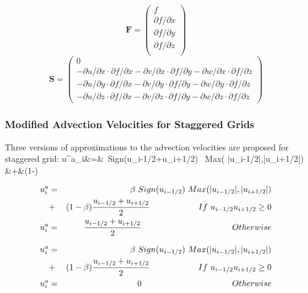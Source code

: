\begin{equation}
\textbf{F}=
\begin{pmatrix}
f \\ \partial f/\partial x \\ \partial f/\partial y \\ \partial f/\partial z \\
\end{pmatrix}
\end{equation}
\begin{equation}
\textbf{S}=
\begin{pmatrix}
0
\\ -\partial u /\partial x \cdot \partial f/\partial x-\partial v /\partial x \cdot \partial f/\partial
y-\partial w /\partial x \cdot \partial f/\partial z
\\ -\partial u /\partial y \cdot \partial f/\partial x-\partial v /\partial y \cdot \partial f/\partial
y-\partial w /\partial y \cdot \partial f/\partial z
\\ -\partial u /\partial z \cdot \partial f/\partial x-\partial v /\partial z \cdot \partial f/\partial
y-\partial w /\partial z \cdot \partial f/\partial z
\end{pmatrix}
\end{equation}

\subsubsection*{Modified Advection Velocities for Staggered Grids}

Three versions of approximations to the advection velocities are proposed for staggered grid:
\ba
u^a_{i}&=&\beta \ Sign(u_{i-1/2}+u_{i+1/2}) \ Max( |u_{i-1/2}|,|u_{i+1/2}|)\nn \\
&+&(1-\beta) 
\ea

\begin{eqnarray}
u^a_{i}&=&
\beta \ Sign(u_{i-1/2})\ Max( |u_{i-1/2}|,|u_{i+1/2}|) \nonumber \\
&+& (1-\beta) \frac{u_{i-1/2}+u_{i+1/2}}{2}
\hspace{0.8in}  If \ u_{i-1/2}u_{i+1/2} \geq 0 \nonumber \\
u^a_{i}&=& \frac{u_{i-1/2}+u_{i+1/2}}{2} \hspace{1.5in} Otherwise
\end{eqnarray}

\begin{eqnarray}
u^a_{i}&=&
\beta \ Sign(u_{i-1/2})\ Max( |u_{i-1/2}|,|u_{i+1/2}|) \nonumber \\
&+& (1-\beta) \frac{u_{i-1/2}+u_{i+1/2}}{2}
\hspace{0.8in}  If \ u_{i-1/2}u_{i+1/2} \geq 0 \nonumber \\
u^a_{i}&=& 0 \hspace{1.5in} Otherwise
\label{eqn:CIP-modified-beta}
\end{eqnarray}


